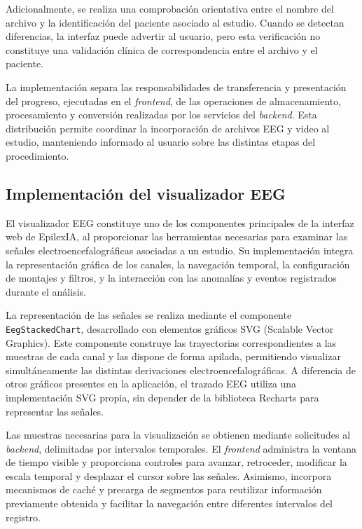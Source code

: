 Adicionalmente, se realiza una comprobación
orientativa entre el nombre del archivo
y la identificación del paciente asociado
al estudio. Cuando se detectan diferencias,
la interfaz puede advertir al usuario,
pero esta verificación no constituye
una validación clínica de correspondencia
entre el archivo y el paciente.

La implementación separa las
responsabilidades de transferencia y
presentación del progreso, ejecutadas
en el \textit{frontend}, de las operaciones de
almacenamiento, procesamiento y conversión
realizadas por los servicios del \textit{backend}.
Esta distribución permite coordinar
la incorporación de archivos EEG y video
al estudio, manteniendo informado al
usuario sobre las distintas etapas
del procedimiento.


\subsection{Implementación del visualizador EEG}

El visualizador EEG constituye uno de los
componentes principales de la interfaz web
de EpilexIA, al proporcionar las herramientas
necesarias para examinar las señales
electroencefalográficas asociadas a un estudio.
Su implementación integra la representación
gráfica de los canales, la navegación temporal,
la configuración de montajes y filtros, y
la interacción con las anomalías y eventos
registrados durante el análisis.

La representación de las señales se realiza
mediante el componente \texttt{EegStackedChart},
desarrollado con elementos gráficos SVG
(Scalable Vector Graphics). Este componente
construye las trayectorias correspondientes
a las muestras de cada canal y las dispone
de forma apilada, permitiendo visualizar
simultáneamente las distintas derivaciones
electroencefalográficas. A diferencia de
otros gráficos presentes en la aplicación,
el trazado EEG utiliza una implementación
SVG propia, sin depender de la biblioteca
Recharts para representar las señales.

Las muestras necesarias para la visualización
se obtienen mediante solicitudes al \textit{backend},
delimitadas por intervalos temporales.
El \textit{frontend} administra la ventana de tiempo
visible y proporciona controles para avanzar,
retroceder, modificar la escala temporal
y desplazar el cursor sobre las señales.
Asimismo, incorpora mecanismos de caché
y precarga de segmentos para reutilizar
información previamente obtenida y facilitar
la navegación entre diferentes intervalos
del registro.

